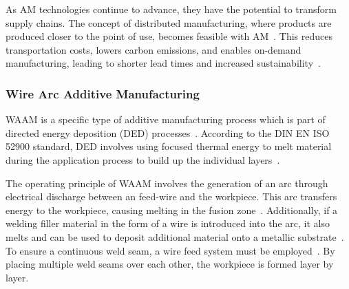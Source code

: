 
As \acrshort{AM} technologies continue to advance, they have the potential to transform supply chains. The concept of distributed manufacturing, where products are produced closer to the point of use, becomes feasible with AM~\cite{Jandyal.2022}. This reduces transportation costs, lowers carbon emissions, and enables on-demand manufacturing, leading to shorter lead times and increased sustainability~\cite{Haleem.2019}.



\subsubsection{Wire Arc Additive Manufacturing}
\acrshort{WAAM} is a specific type of additive manufacturing process which is part of directed energy deposition (\acrshort{DED}) processes~\cite{Svetlizky.2021}. According to the DIN EN ISO 52900 standard, DED involves using focused thermal energy to melt material during the application process to build up the individual layers~\cite{Additive}. 

The operating principle of \acrshort{WAAM} involves the generation of an arc through electrical discharge between an feed-wire and the workpiece. This arc transfers energy to the workpiece, causing melting in the fusion zone~\cite{Ou.2018}. Additionally, if a welding filler material in the form of a wire is introduced into the arc, it also melts and can be used to deposit additional material onto a metallic substrate~\cite{Cunningham.2018}. To ensure a continuous weld seam, a wire feed system must be employed~\cite{Ding.2015}. By placing multiple weld seams over each other, the workpiece is formed layer by layer.


